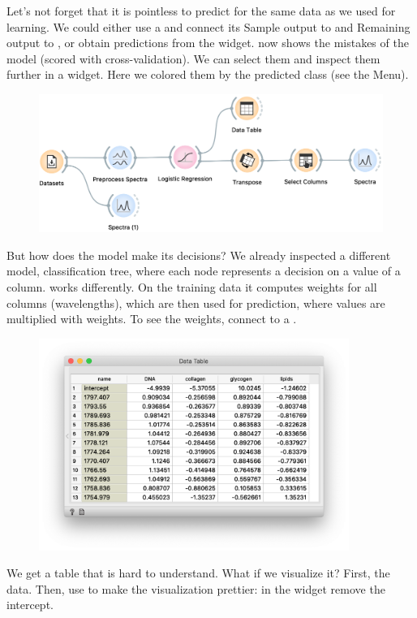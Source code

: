 \noindent Let’s not forget that it is pointless to predict for the same data as we used for learning. We could either  use a  and connect its Sample output to  and Remaining output to , or obtain predictions from the  widget.
 now shows the mistakes of the model (scored with cross-validation). We can select them and inspect them further in a  widget. Here we colored them by the predicted class (see the Menu). 

\begin{figure}
  \centering
  \includegraphics[width=1.1\textwidth]{sp_classification-fig3.png}%
  \label{fig:spectra_classification-fig3}
\end{figure}

But how does the model make its decisions? We already inspected a different model, classification tree, where each node represents a decision on a value of a column.   works differently. On the training data it computes weights for all columns (wavelengths), which are then used for prediction, where values are multiplied with weights. To see the weights, connect  to a . 

\begin{figure}
  \vspace{-0.7cm}
  \includegraphics[width=0.9\textwidth]{sp_classification-fig4.png}
  \label{fig:spectra_classification-fig4}
\end{figure}
We get a table that is hard to understand. What if we visualize it? First,  the data. Then, use  to make the visualization prettier: in the widget remove the intercept.

